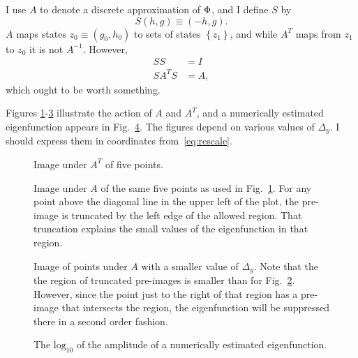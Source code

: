 \documentclass[twocolumn]{article}
\begin{document}
I use $A$ to denote a discrete approximation of $\Phi$, and I define
$S$ by
\begin{equation*}
  S (h,g) \equiv (-h,g).
\end{equation*}
$A$ maps states $z_0 \equiv (g_0,h_0)$ to sets of states
$\left\{z_1 \right\}$, and while $A^T$ maps from $z_1$ to $z_0$ it is
not $A^{-1}$.  However,
\begin{align*}
  SS &= I \\
  SA^TS &= A,
\end{align*}
which ought to be worth something.

Figures \ref{fig:Av1}-\ref{fig:Av3} illustrate the action of $A$ and
$A^T$, and a numerically estimated eigenfunction appears in
Fig.~\ref{fig:eigenfunction}.  The figures depend on various values of
$\Delta_y$.  I should express them in coordinates
from~\eqref{eq:rescale}.
\begin{figure}
  \centering
    \caption{Image under $A^T$ of five points.}
  \label{fig:Av1}
\end{figure}

\begin{figure}
  \centering
    \caption{Image under $A$ of the same five points as used in
      Fig.~\ref{fig:Av1}.  For any point above the diagonal line in
      the upper left of the plot, the pre-image is truncated by the
      left edge of the allowed region.  That truncation explains the
      small values of the eigenfunction in that region.}
  \label{fig:Av2}
\end{figure}

\begin{figure}
  \centering
    \caption{Image of points under $A$ with a smaller value of
      $\Delta_y$.  Note that the the region of truncated pre-images is
      smaller than for Fig.~\ref{fig:Av2}.  However, since the point
      just to the right of that region has a pre-image that intersects
      the region, the eigenfunction will be suppressed there in a second
      order fashion.}
  \label{fig:Av3}
\end{figure}

\begin{figure}
  \centering
    \caption{The $\text{log}_{10}$ of the amplitude of a numerically
      estimated eigenfunction.}
  \label{fig:eigenfunction}
\end{figure}
\end{document}
